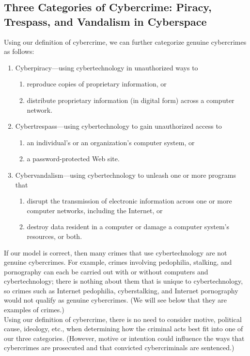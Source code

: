 \documentclass[12pt]{article}
\theoremstyle{definition}
\begin{document}
\subsection{Three Categories of Cybercrime: Piracy, Trespass, and Vandalism in Cyberspace}
Using our definition of cybercrime, we can further categorize genuine cybercrimes as
follows:
\begin{enumerate}
\item Cyberpiracy—using cybertechnology in unauthorized ways to
\begin{enumerate}
\item reproduce copies of proprietary information, or
\item distribute proprietary information (in digital form) across a computer
network.
\end{enumerate}
\item Cybertrespass—using cybertechnology to gain unauthorized access to
\begin{enumerate}
\item an individual’s or an organization’s computer system, or
\item a password-protected Web site.
\end{enumerate}
\item Cybervandalism—using cybertechnology to unleash one or more programs that
\begin{enumerate}
\item disrupt the transmission of electronic information across one or more
computer networks, including the Internet, or
\item destroy data resident in a computer or damage a computer system’s
resources, or both.
\end{enumerate}
\end{enumerate}
If our model is correct, then many crimes that use cybertechnology are not genuine
cybercrimes. For example, crimes involving pedophilia, stalking, and pornography can
each be carried out with or without computers and cybertechnology; there is nothing
about them that is unique to cybertechnology, so crimes such as Internet pedophilia,
cyberstalking, and Internet pornography would not qualify as genuine cybercrimes. (We
will see below that they are examples of  crimes.)\\
Using our
definition of cybercrime, there is no need to consider motive, political cause, ideology,
etc., when determining how the criminal acts best fit into one of our three categories.
(However, motive or intention could influence the ways that cybercrimes are prosecuted
and that convicted cybercriminals are sentenced.)
\end{document}
